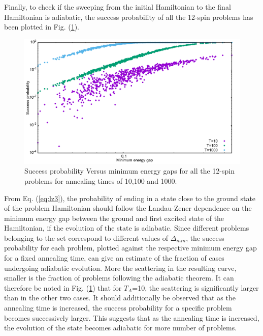 \documentclass[../main.tex]{subfiles}
\begin{document}
Finally, to check if the sweeping from the initial Hamiltonian to the final Hamiltonian is adiabatic, the success probability of all the 12-spin problems has been plotted in Fig. (\ref{fig:o10}).
\begin{figure}[H]
\centering 
\includegraphics[scale=0.24]{GapVsSucc_s12_T10_100_1000.png}
\caption{Success probability Versus minimum energy gaps for all the 12-spin problems for annealing times of 10,100 and 1000.}
\label{fig:o10}
\end{figure}
From Eq. (\ref{eq:lz3}), the probability of ending in a state close to the ground state of the problem Hamiltonian should follow the Landau-Zener dependence on the minimum energy gap between the ground and first excited state of the Hamiltonian, if the evolution of the state is adiabatic. Since different problems belonging to the set correspond to different values of $\Delta_{min}$, the success probability for each problem, plotted against the respective minimum energy gap for a fixed annealing time, can give an estimate of the fraction of cases undergoing adiabatic evolution. More the scattering in the resulting curve, smaller is the fraction of problems following the adiabatic theorem. It can therefore be noted in Fig. (\ref{fig:o10}) that for $T_A$=10, the scattering is significantly larger than in the other two cases. It should additionally be observed that as the annealing time is increased, the success probability for a specific problem becomes successively larger. This suggests that as the annealing time is increased, the evolution of the state becomes adiabatic for more number of problems.
\end{document}
